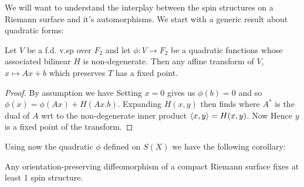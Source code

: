\documentclass{article}
\begin{document}
We will want to understand the interplay between the spin structures on a Riemann surface and it's automorphisms. We start with a generic result about quadratic forms:

\begin{lemma}\label{lemma: preserving quadratic gives fixed point}
	Let $V$ be a f.d. v.sp over $F_2$ and let $\phi:V \to F_2$ be a quadratic functions whose associated bilinear $H$ is non-degenerate. Then any affine transform of $V$, $x \mapsto Ax+b$ which preserves $T$ has a fixed point.  
\end{lemma}
\begin{proof}
	By assumption we have
Setting $x=0$ gives us $\phi(b)=0$ and so $\phi(x) = \phi(Ax)+H(Ax.b)$. Expanding $H(x,y)$ then finds 
where $A^\ast$ is the dual of $A$ wrt to the non-degenerate inner product $\left\langle x,y \right\rangle = H(x,y)$. Now 
Hence $y$ is a fixed point of the transform. 
\end{proof}

Using now the quadratic $\phi$ defined on $S(X)$ we have the following corollary:

\begin{corollary}
	Any orientation-preserving diffeomorphism of a compact Riemann surface fixes at least 1 spin structure.
\end{corollary}
\end{document}
